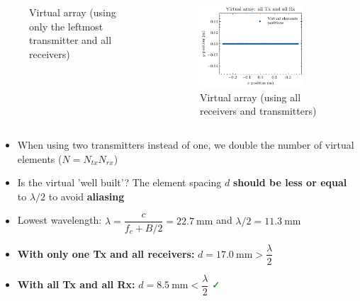 \documentclass[UKenglish,8pt,aspectratio=1610]{beamer}
\begin{document}
\begin{frame}
\begin{columns}
\begin{column}{0.33\textwidth}
\begin{figure}[h!]
		\centering
		\caption{Virtual array (using only the leftmost transmitter and all receivers)}
	\end{figure}
\end{column}
	\begin{column}{0.33\textwidth}
	\begin{figure}[h!]
		\includegraphics[width=0.8\textwidth]{question2/virtual_array_all_tx.pdf}
		\centering
		\caption{Virtual array (using all receivers and transmitters)}
	\end{figure}
\end{column}
\end{columns}
\begin{itemize}
	\item When using two transmitters instead of one, we double the number of virtual elements ($N=N_{tx}N_{rx}$)
	\item Is the virtual 'well built'? The element spacing $d$ \textbf{should be less or equal} to $\lambda/2$ to avoid \textbf{aliasing}
	\item Lowest wavelength: $\lambda = \dfrac{c}{f_c + B/2} = 22.7~\si{\milli\meter}$ and $\lambda/2=11.3~\si{\milli\meter}$
	\item \textbf{With only one Tx and all receivers:} $d=17.0~\si{\milli\meter}>\dfrac{\lambda}{2}$ \textcolor{red}{\faTimes}
	\item \textbf{With all Tx and all Rx:} $d=8.5~\si{\milli\meter}<\dfrac{\lambda}{2}$ \textcolor{green}{\faCheck}
\end{itemize}
\end{frame}
\end{document}

